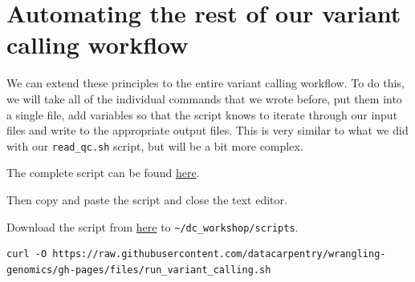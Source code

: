 \documentclass[
  letterpaper,
  DIV=11,
  numbers=noendperiod]{scrreprt}
\newenvironment{Shaded}{\begin{snugshade}}{\end{snugshade}}
\newcommand{\ExtensionTok}[1]{\textcolor[rgb]{0.00,0.23,0.31}{#1}}
\newcommand{\NormalTok}[1]{\textcolor[rgb]{0.00,0.23,0.31}{#1}}
\begin{document}
\hypertarget{automating-the-rest-of-our-variant-calling-workflow}{%
\section{Automating the rest of our variant calling
workflow}\label{automating-the-rest-of-our-variant-calling-workflow}}

We can extend these principles to the entire variant calling workflow.
To do this, we will take all of the individual commands that we wrote
before, put them into a single file, add variables so that the script
knows to iterate through our input files and write to the appropriate
output files. This is very similar to what we did with our
\texttt{read\_qc.sh} script, but will be a bit more complex.

The complete script can be found
\href{https://raw.githubusercontent.com/datacarpentry/wrangling-genomics/gh-pages/files/run_variant_calling.sh}{here}.

\begin{Shaded}
\end{Shaded}

Then copy and paste the script and close the text editor.

\begin{tcolorbox}[enhanced jigsaw, toptitle=1mm, breakable, bottomrule=.15mm, colback=white, toprule=.15mm, opacityback=0, bottomtitle=1mm, coltitle=black, opacitybacktitle=0.6, rightrule=.15mm, colframe=quarto-callout-note-color-frame, titlerule=0mm, colbacktitle=quarto-callout-note-color!10!white, title=\textcolor{quarto-callout-note-color}{\faInfo}\hspace{0.5em}{Possibility to download the script}, left=2mm, leftrule=.75mm, arc=.35mm]

Download the script from
\href{https://raw.githubusercontent.com/datacarpentry/wrangling-genomics/gh-pages/files/run_variant_calling.sh}{here}
to \texttt{\textasciitilde{}/dc\_workshop/scripts}.

\begin{verbatim}
curl -O https://raw.githubusercontent.com/datacarpentry/wrangling-genomics/gh-pages/files/run_variant_calling.sh
\end{verbatim}

\end{tcolorbox}
\end{document}
